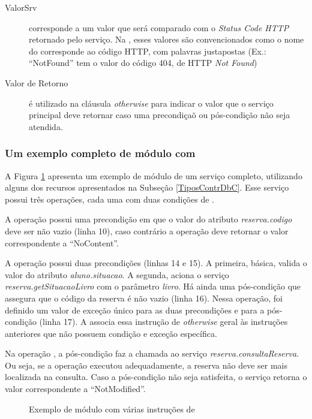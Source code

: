 \begin{description}
 \item [ValorSrv] corresponde a um valor que será comparado com o
 \textit{Status Code HTTP} retornado pelo serviço. Na \neoidl{}, esses valores
 são convencionados como o nome do corresponde ao código HTTP, com palavras
 justapostas (Ex.: ``NotFound'' tem o valor do código 404, de HTTP \textit{Not
 Found})

\item [Valor de Retorno] é utilizado na cláusula \emph{otherwise} para indicar o
valor que o serviço principal deve retornar caso uma precondiçaõ ou pós-condição
não seja atendida.

\end{description}


\subsubsection{Um exemplo completo de módulo com \designbycontract{}}

A Figura \ref{lst:ModuloNeoVariosDbC} apresenta um exemplo de módulo \neoidl{}
de um serviço completo, utilizando alguns dos recursos apresentados na Subseção
\ref{TiposContrDbC}. Esse serviço possui três operações, cada uma com duas
condições de \designbycontract{}.

A operação  possui uma precondição em que o valor do atributo
\emph{reserva.codigo} deve ser não vazio (linha 10), caso contrário a
operação deve retornar o valor correspondente a ``NoContent''.

A operação  possui duas precondições (linhas 14 e 15). A primeira,
básica, valida o valor do atributo \emph{aluno.situacao}. A segunda, aciona o
serviço \emph{reserva.getSituacaoLivro} com o parâmetro \emph{livro}. Há ainda
uma pós-condição que assegura que o código da reserva é não vazio (linha 16).
Nessa operação, foi definido um valor de exceção único para as duas precondições
e para a pós-condição (linha 17).
A \neoidl{} associa essa instrução de \emph{otherwise} geral às instruções anteriores que
não possuem condição e exceção específica.

Na operação , a pós-condição faz a chamada ao serviço
\emph{reserva.consultaReserva}. Ou seja, se a operação  executou
adequadamente, a reserva não deve ser mais localizada na consulta. Caso a
pós-condição não seja satisfeita, o serviço retorna o valor correspondente a
``NotModified''.

\begin{figure}[htb]
\begin{small} 

\end{small}
\caption{Exemplo de módulo \neoidl{} com várias instruções de \designbycontract{}}
\label{lst:ModuloNeoVariosDbC}
\end{figure} 	
 


